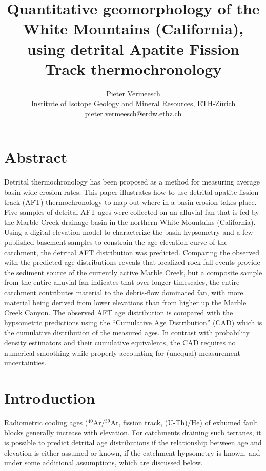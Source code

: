 \documentclass[12pt,twoside]{article}
\title{Quantitative geomorphology of the White Mountains
(California), using detrital Apatite Fission Track thermochronology}
\author{Pieter Vermeesch\\
Institute of Isotope Geology and Mineral Resources, ETH-Z\"{u}rich
\\ pieter.vermeesch@erdw.ethz.ch}
\begin{document}
\maketitle
\section*{Abstract}

Detrital thermochronology has been  proposed as a method for measuring
average basin-wide  erosion rates. This  paper illustrates how  to use
detrital apatite fission track (AFT) thermochronology to map out where
in a basin erosion takes place. Five samples of detrital AFT ages were
collected on an alluvial fan that  is fed by the Marble Creek drainage
basin in  the northern White Mountains (California).   Using a digital
elevation  model  to  characterize  the  basin hypsometry  and  a  few
published basement samples to constrain the age-elevation curve of the
catchment, the detrital AFT distribution was predicted.  Comparing the
observed with  the predicted age distributions  reveals that localized
rock fall events  provide the sediment source of  the currently active
Marble  Creek, but  a composite  sample from  the entire  alluvial fan
indicates   that  over   longer  timescales,   the   entire  catchment
contributes  material  to the  debris-flow  dominated  fan, with  more
material being derived  from lower elevations than from  higher up the
Marble Creek  Canyon.  The observed  AFT age distribution  is compared
with   the  hypsometric   predictions  using   the   ``Cumulative  Age
Distribution''  (CAD)  which is  the  cumulative  distribution of  the
measured  ages. In  contrast with  probability density  estimators and
their cumulative equivalents, the  CAD requires no numerical smoothing
while properly accounting for (unequal) measurement uncertainties.

\section{Introduction}
\label{sec:introduction}

Radiometric   cooling   ages   ($^{40}$Ar/$^{39}$Ar,  fission   track,
(U-Th)/He) of exhumed fault  blocks generally increase with elevation. 
For  catchments draining  such  terranes, it  is  possible to  predict
detrital  age  distributions  if  the  relationship  between  age  and
elevation is either  assumed or known, if the  catchment hypsometry is
known,  and under  some  additional assumptions,  which are  discussed
below.\\
\end{document}
